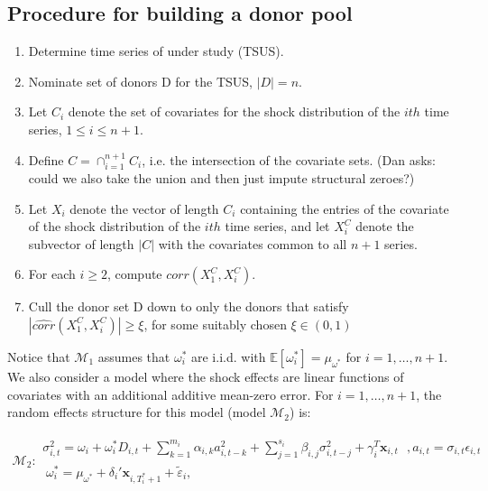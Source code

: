 \documentclass[11pt]{article}
\newcommand{\x}{\textbf{x}}
\def\mbf#1{\mathbf{#1}} %
\def\t#1{\tilde{#1}} %
\def\mc#1{\mathcal{#1}} %
\def\E{\mathbb{E}} %
\def\mc#1{\mathcal{#1}}
\theoremstyle{definition}
\begin{document}
\subsection{Procedure for building a donor pool}
\begin{enumerate}
\item Determine time series of under study (TSUS).
\item Nominate set of donors D for the TSUS, $|D| = n$.
\item Let $C_{i}$ denote the set of covariates for the shock distribution of the $ith$ time series, $1 \leq i \leq n + 1$.  
\item Define $C = \cap^{n+1}_{i=1}C_{i}$, i.e. the intersection of the covariate sets. (Dan asks: could we also take the union and then just impute structural zeroes?)
\item Let $X_{i}$ denote the vector of length $C_{i}$ containing the entries of the covariate of the shock distribution of the $ith$ time series, and let $X_{i}^{C}$ denote the subvector of length $|C|$ with the covariates common to all $n+1$ series.
\item For each $i\geq 2$, compute $\widehat{corr}(X_{1}^{C}, X_{i}^{C})$.
\item Cull the donor set D down to only the donors that satisfy $|\widehat{corr}(X_{1}^{C}, X_{i}^{C})|\geq \xi$, for some suitably chosen $\xi \in (0,1)$

\end{enumerate}









Notice that $\mc{M}_1$ assumes that $\omega^{*}_i$ are i.i.d. with $\E[ \omega^{*}_i]=\mu_{\omega^{*}}$ 
for $i = 1, \ldots, n+1$. We also consider a model where the shock effects are linear functions of covariates with an additional additive mean-zero error. For $i = 1, \ldots, n+1$, the random effects structure for this model (model $\mc{M}_2$) is:




\begin{align}
\mc{M}_2 \colon \begin{array}{l}
   \sigma^{2}_{i,t} = \omega_{i} + \omega^{*}_i D_{i,t}  + \sum^{m_{i}}_{k=1}\alpha_{i,k}a^{2}_{i,t-k} + \sum_{j=1}^{s_{i}}\beta_{i,j}\sigma_{i,t-j}^{2} + \gamma_{i}^{T} \x_{i,t} \text{ }, a_{i,t} = \sigma_{i,t}\epsilon_{i,t}\\[.2cm]
  \; \omega_i^{*} = \mu_{\omega^{*}}+\delta_{i}'\mbf{x}_{i, T_i^*+1}+ \t{\varepsilon}_{i},
\end{array}\label{model2}
\end{align}
\end{document}
